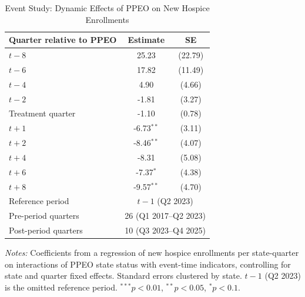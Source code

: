 \begin{table}[htbp]
\centering
\caption{Event Study: Dynamic Effects of PPEO on New Hospice Enrollments}
\label{tab:event_study}
\begin{tabular}{lcc}
\toprule
Quarter relative to PPEO & Estimate & SE \\
\midrule
$t-8$ & 25.23 & (22.79) \\
$t-6$ & 17.82 & (11.49) \\
$t-4$ & 4.90 & (4.66) \\
$t-2$ & -1.81 & (3.27) \\
Treatment quarter & -1.10 & (0.78) \\
$t+1$ & -6.73$^{**}$ & (3.11) \\
$t+2$ & -8.46$^{**}$ & (4.07) \\
$t+4$ & -8.31 & (5.08) \\
$t+6$ & -7.37$^{*}$ & (4.38) \\
$t+8$ & -9.57$^{**}$ & (4.70) \\
\midrule
Reference period & \multicolumn{2}{c}{$t-1$ (Q2 2023)} \\
Pre-period quarters & \multicolumn{2}{c}{26 (Q1 2017--Q2 2023)} \\
Post-period quarters & \multicolumn{2}{c}{10 (Q3 2023--Q4 2025)} \\
\bottomrule
\end{tabular}
\vspace{0.5em}
\begin{minipage}{\textwidth}
\small \textit{Notes:} Coefficients from a regression of new hospice enrollments per state-quarter on interactions of PPEO state status with event-time indicators, controlling for state and quarter fixed effects. Standard errors clustered by state. $t-1$ (Q2 2023) is the omitted reference period. $^{***}p<0.01$, $^{**}p<0.05$, $^{*}p<0.1$.
\end{minipage}
\end{table}
